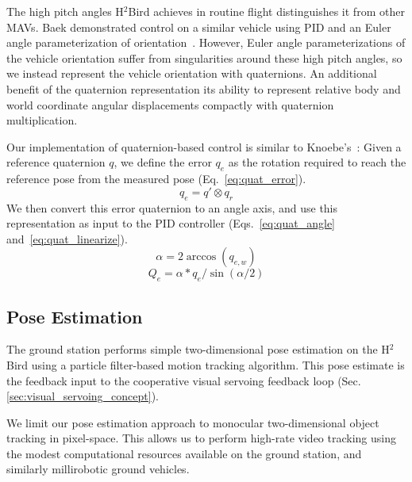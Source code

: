 \documentclass{aamas2013}
\begin{document}
The high pitch angles H$^2$Bird achieves in routine flight distinguishes it 
from other MAVs. Baek 
demonstrated control on a similar vehicle using PID and an Euler angle
parameterization of orientation~\cite{baek:tracking}. However, Euler angle parameterizations of the vehicle orientation 
suffer from singularities around these high pitch angles, so we instead 
represent the vehicle orientation with quaternions. An additional benefit of 
the quaternion representation its ability to represent relative body and 
world coordinate angular displacements compactly with quaternion 
multiplication.

Our implementation of quaternion-based control is similar to Knoebe's~\cite{knoebe:quatcontrol}:
Given a reference quaternion $q$, we define the error $q_e$ as the rotation 
required to reach the reference pose from the measured pose (Eq.~\ref{eq:quat_error}). 
\begin{equation}
\label{eq:quat_error}
q_e = q'\otimes q_r
\end{equation}
We then convert this error quaternion to an angle axis, and use this 
representation as input to the PID controller 
(Eqs.~\ref{eq:quat_angle} and~\ref{eq:quat_linearize}). 
\begin{equation}
\label{eq:quat_angle}
\alpha = 2\arccos(q_{e,w})
\end{equation}
\begin{equation}
\label{eq:quat_linearize}
Q_e = \alpha*q_e/\sin(\alpha /2)
\end{equation}

\subsection{Pose Estimation}
The ground station performs simple two-dimensional pose estimation on the H$^2$Bird using 
a particle filter-based motion tracking algorithm. This pose estimate is 
the feedback input to the cooperative visual servoing feedback loop (Sec. \ref{sec:visual_servoing_concept}).

We limit our pose estimation approach to monocular two-dimensional object 
tracking in pixel-space. This allows us to perform high-rate video tracking 
using the modest computational resources available on the ground station, 
and similarly millirobotic ground vehicles.

~\cite{thrun2005probabilistic}

\end{document}

